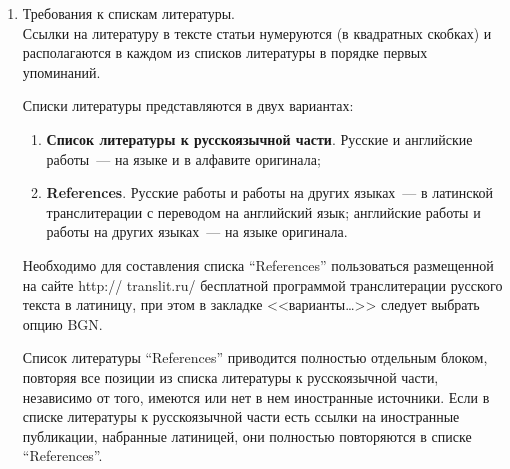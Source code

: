 {\begin{enumerate}[1.]
\begin{itemize}
{\sf http://www.ipiran.ru/journal/issues/2013\_07\_01\_eng/authors.asp};
\item аннотация (не менее 100~слов на каждом из языков). Аннотация~--- это краткое
резюме работы, которое может публиковаться отдельно. Она является основным
источником информации в~ин\-фор\-ма\-ци\-он\-ных системах и базах данных. Английская
аннотация должна быть оригинальной, может не быть дословным переводом русского
текста и должна быть написана хорошим английским языком. В~аннотации не должно
быть ссылок на литературу и, по возможности, формул;
\item ключевые слова~--- желательно из принятых в мировой
на\-уч\-но-тех\-ни\-че\-ской литературе тематических тезаурусов. Предложения не
могут быть ключевыми словами;
\item источники финансирования работы (ссылки на гранты, проекты,
поддерживающие организации и~т.\,п.).
\end{itemize}




\item  Требования к спискам литературы.\\[-13pt]

Ссылки на литературу в тексте статьи нумеруются (в квадратных скобках) и
располагаются в каждом из списков литературы в порядке  первых упоминаний.

Списки литературы представляются в двух вариантах:
\begin{enumerate}[(1)]
\item \textbf{Список литературы к русскоязычной части}. Русские и английские
работы~---  на языке и в алфавите оригинала;\\[-13.5pt]
\item  \textbf{References}. Русские работы и работы на других языках~--- в латинской
транслитерации с переводом на английский язык; английские работы и работы на других
языках~--- на языке оригинала.
\end{enumerate}

Необходимо для составления списка ``References'' пользоваться размещенной на сайте
{\sf http:// translit.ru/} бесплатной программой транслитерации русского текста в латиницу, при этом в закладке <<варианты\ldots>> следует выбрать
опцию BGN.

Список литературы ``References'' приводится полностью отдельным блоком, повторяя все
позиции из списка литературы к русскоязычной части, независимо от того, имеются или
нет в нем иностранные источники. Если в списке литературы к русскоязычной части есть
ссылки на иностранные публикации, набранные латиницей, они полностью повторяются в
списке ``References''.


\end{enumerate}}
